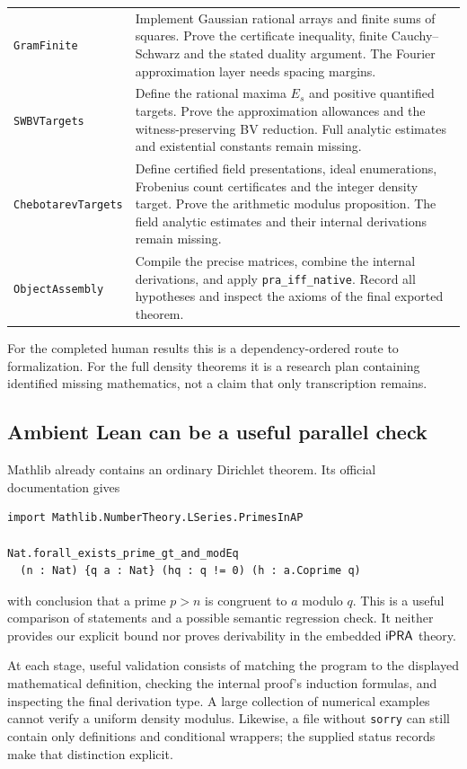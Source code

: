\begin{longtable}{@{}p{38mm}p{107mm}@{}}
\texttt{GramFinite} & Implement Gaussian rational arrays and finite sums of squares. Prove the certificate inequality, finite Cauchy--Schwarz and the stated duality argument. The Fourier approximation layer needs spacing margins. \\
\texttt{SWBVTargets} & Define the rational maxima $E_s$ and positive quantified targets. Prove the approximation allowances and the witness-preserving BV reduction. Full analytic estimates and existential constants remain missing. \\
\texttt{ChebotarevTargets} & Define certified field presentations, ideal enumerations, Frobenius count certificates and the integer density target. Prove the arithmetic modulus proposition. The field analytic estimates and their internal derivations remain missing. \\
\texttt{ObjectAssembly} & Compile the precise matrices, combine the internal derivations, and apply \texttt{pra\_iff\_native}. Record all hypotheses and inspect the axioms of the final exported theorem. \\
\bottomrule
\end{longtable}

For the completed human results this is a dependency-ordered route to formalization. For the full density theorems it is a research plan containing identified missing mathematics, not a claim that only transcription remains.

\subsection{Ambient Lean can be a useful parallel check}

Mathlib already contains an ordinary Dirichlet theorem. Its official documentation gives \cite{MathlibAP}
\begin{lstlisting}
import Mathlib.NumberTheory.LSeries.PrimesInAP

Nat.forall_exists_prime_gt_and_modEq
  (n : Nat) {q a : Nat} (hq : q != 0) (h : a.Coprime q)
\end{lstlisting}
with conclusion that a prime $p>n$ is congruent to $a$ modulo $q$.
This is a useful comparison of statements and a possible semantic regression check. It neither provides our explicit bound nor proves derivability in the embedded $\mathsf{iPRA}$ theory.

At each stage, useful validation consists of matching the program to the displayed mathematical definition, checking the internal proof's induction formulas, and inspecting the final derivation type. A large collection of numerical examples cannot verify a uniform density modulus. Likewise, a file without \texttt{sorry} can still contain only definitions and conditional wrappers; the supplied status records make that distinction explicit.
